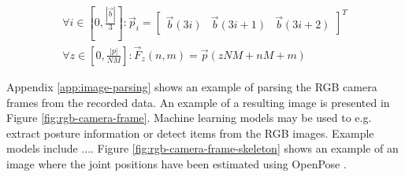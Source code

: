 \begin{align}
    \label{eq:rgb-pixels}
    \forall i \in \left[ 0, \frac{ | \vec{b} | }{3} \right] : \vec{p}_{i} = \begin{bmatrix} \vec{b}(3i) & \vec{b}(3i+1) & \vec{b}(3i+2) \end{bmatrix}^T
    \\
    \label{eq:rgb-pixels-to-frames}
    \forall z \in \left[ 0, \frac{|p|}{NM} \right] : \vec{F}_{z}(n, m) = \vec{p}(zNM + nM + m)
\end{align}

Appendix \ref{app:image-parsing} shows an example of parsing the RGB camera frames from the recorded data.
An example of a resulting image is presented in Figure \ref{fig:rgb-camera-frame}.
Machine learning models may be used to e.g. extract posture information or detect items from the RGB images.
Example models include ....
Figure \ref{fig:rgb-camera-frame-skeleton} shows an example of an image
where the joint positions have been estimated using OpenPose \cite{openpose}.

